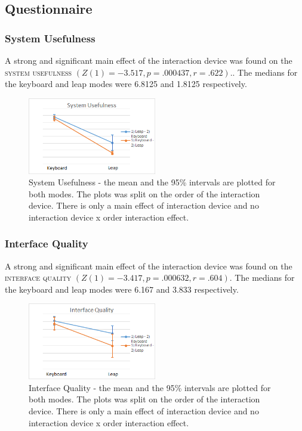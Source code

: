 \subsection{Questionnaire}
\subsubsection{System Usefulness}

A strong and significant main effect of the interaction device was found on the \textsc{system usefulness} $(Z(1) = -3.517, p = .000437, r = .622)$.. The medians for the keyboard and leap modes were 6.8125 and 1.8125 respectively.

\begin{figure}[!htbp]
\centering
\includegraphics[width=0.5\textwidth]{imgs/results/system_usefulness}
\caption{System Usefulness - the mean and the 95\% intervals are plotted for both modes. The plots was split on the order of the interaction device. There is only a main effect of interaction device and no interaction device x order interaction effect.}
\label{fig:system_usefulness}
\end{figure}

\subsubsection{Interface Quality}

A strong and significant main effect of the interaction device was found on the \textsc{interface quality} $(Z(1) = -3.417, p = .000632, r = .604)$. The medians for the keyboard and leap modes were 6.167 and 3.833 respectively.

\begin{figure}[!htbp]
\centering
\includegraphics[width=0.5\textwidth]{imgs/results/interface_quality}
\caption{Interface Quality - the mean and the 95\% intervals are plotted for both modes. The plots was split on the order of the interaction device. There is only a main effect of interaction device and no interaction device x order interaction effect.}
\label{fig:interface_quality}
\end{figure}

